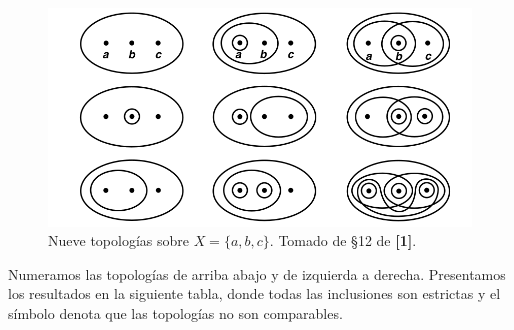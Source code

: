\documentclass{article}
\newcommand{\xmark}{\ding{55}}
\begin{document}
\begin{figure}[h]
\centering \includegraphics{fig1.png}
\caption{Nueve topologías sobre $X = \{a, b, c\}$. Tomado de §12 de \textbf{[1]}. }
\end{figure}
Numeramos las topologías de arriba abajo y de izquierda a derecha. Presentamos los resultados en la siguiente tabla, donde todas las inclusiones son estrictas y  el símbolo \textcolor{red}{\xmark} denota que las topologías no son comparables.
\end{document}
